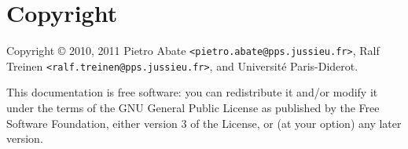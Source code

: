 
\section{Copyright}
\label{sec:copyright}
Copyright \copyright {} 2010, 2011 Pietro Abate
\verb|<pietro.abate@pps.jussieu.fr>|, Ralf Treinen
\verb|<ralf.treinen@pps.jussieu.fr>|, and Université Paris-Diderot.

This documentation is free software: you can redistribute it and/or
modify it under the terms of the GNU General Public License as
published by the Free Software Foundation, either version 3 of the
License, or (at your option) any later version.
